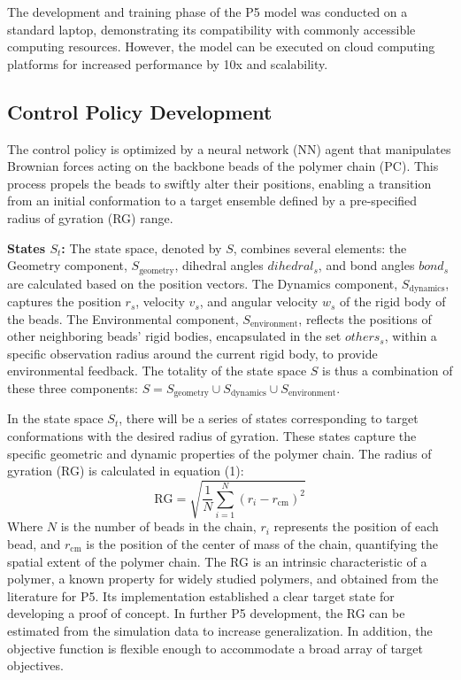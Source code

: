 \documentclass{article}
\theoremstyle{plain}
\theoremstyle{definition}
\theoremstyle{remark}
\begin{document}
The development and training phase of the P5 model was conducted on a standard laptop, demonstrating its compatibility with commonly accessible computing resources. However, the model can be executed on cloud computing platforms for increased performance by 10x and scalability.


\subsection{Control Policy Development}

The control policy is optimized by a neural network (NN) agent that manipulates Brownian forces acting on the backbone beads of the polymer chain (PC). This process propels the beads to swiftly alter their positions, enabling a transition from an initial conformation to a target ensemble defined by a pre-specified radius of gyration (RG) range.

\textbf{States $S_t$: }The state space, denoted by $S$, combines several elements: the Geometry component, $S_{\text{geometry}}$, dihedral angles $dihedral_s$, and bond angles $bond_s$ are calculated based on the position vectors. The Dynamics component, $S_{\text{dynamics}}$, captures the position $r_s$, velocity $v_s$, and angular velocity $w_s$ of the rigid body of the beads. The Environmental component, $S_{\text{environment}}$, reflects the positions of other neighboring beads' rigid bodies, encapsulated in the set $others_s$, within a specific observation radius around the current rigid body, to provide environmental feedback. The totality of the state space $S$ is thus a combination of these three components: $S = S_{\text{geometry}} \cup 
S_{\text{dynamics}} \cup S_{\text{environment}}$.

In the state space $S_t$, there will be a series of states corresponding to target conformations with the desired radius of gyration. These states capture the specific geometric and dynamic properties of the polymer chain. The radius of gyration (RG) is calculated in equation (1):
\[
\text{RG} = \sqrt{\frac{1}{N}\sum_{i=1}^{N}(r_i - r_{\text{cm}})^2} \tag{1}
\]
Where $N$ is the number of beads in the chain, $r_i$ represents the position of each bead, and $r_{\text{cm}}$ is the position of the center of mass of the chain, quantifying the spatial extent of the polymer chain. The RG is an intrinsic characteristic of a polymer, a known property for widely studied polymers, and obtained from the literature for P5. Its implementation established a clear target state for developing a proof of concept. In further P5 development, the RG can be estimated from the simulation data to increase generalization. In addition, the objective function is flexible enough to accommodate a broad array of target objectives.
\end{document}
